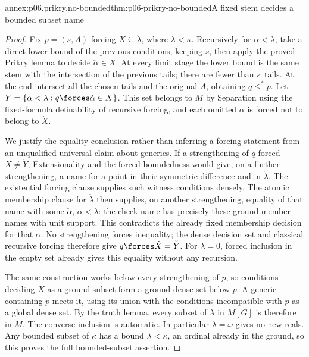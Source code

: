 \begin{annexitem}{annex:p06.prikry.no-bounded}{thm:p06-prikry-no-bounded}{A fixed stem decides a bounded subset name}
\begin{proof}
Fix \(p=(s,A)\) forcing \(\dot X\subseteq\check\lambda\), where
\(\lambda<\kappa\). Recursively for \(\alpha<\lambda\), take a
direct lower bound of the previous conditions, keeping \(s\), then
apply the proved Prikry lemma to decide
\(\check\alpha\in\dot X\). At every limit stage the lower bound
is the same stem with the intersection of the previous tails; there
are fewer than \(\kappa\) tails. At the end intersect all the chosen
tails and the original \(A\), obtaining \(q\leq^*p\).
Let \(Y=\{\alpha<\lambda:q\forces\check\alpha\in\dot X\}\).
This set belongs to \(M\) by Separation using the fixed-formula
definability of recursive forcing, and each omitted \(\alpha\) is
forced not to belong to \(\dot X\).

We justify the equality conclusion rather than inferring a forcing
statement from an unqualified universal claim about generics. If a
strengthening of \(q\) forced \(\dot X\ne\check Y\), Extensionality
and the forced boundedness would give, on a further strengthening, a
name for a point in their symmetric difference and in \(\check\lambda\).
The existential forcing clause supplies such witness conditions densely.
The atomic membership clause for \(\check\lambda\) then supplies,
on another strengthening, equality of that name with some
\(\check\alpha\), \(\alpha<\lambda\): the check name has precisely
these ground member names with unit support. This contradicts the
already fixed membership decision for that \(\alpha\). No strengthening
forces inequality; the dense decision set and classical recursive forcing
therefore give \(q\forces\dot X=\check Y\).
For \(\lambda=0\), forced inclusion in the empty set already gives
this equality without any recursion.

The same construction works below every strengthening of \(p\), so
conditions deciding \(\dot X\) as a ground subset form a ground dense
set below \(p\). A generic containing \(p\) meets it, using its union
with the conditions incompatible with \(p\) as a global dense set.
By the truth lemma, every subset of \(\lambda\) in \(M[G]\) is
therefore in \(M\). The converse inclusion is automatic. In particular
\(\lambda=\omega\) gives no new reals. Any bounded subset of \(\kappa\)
has a bound \(\lambda<\kappa\), an ordinal already in the ground,
so this proves the full bounded-subset assertion.
\end{proof}
\end{annexitem}

